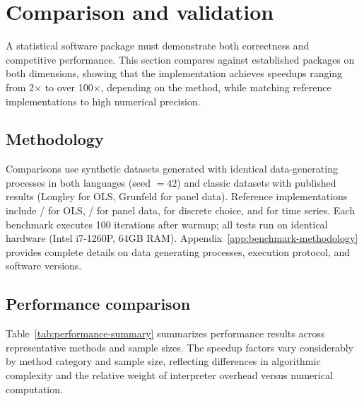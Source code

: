 
\section{Comparison and validation} \label{sec:comparison}

A statistical software package must demonstrate both correctness and competitive
performance. This section compares  against established
 packages on both dimensions, showing that the 
implementation achieves speedups ranging from 2$\times$ to over
100$\times$, depending on the method, while matching reference implementations
to high numerical precision.

\subsection{Methodology}

Comparisons use synthetic datasets generated with identical data-generating
processes in both languages (seed $= 42$) and classic datasets with published
results (Longley for OLS, Grunfeld for panel data). Reference implementations
include / for OLS, / for panel data,
 for discrete choice, and  for time series. Each
benchmark executes 100 iterations after warmup; all tests run on identical
hardware (Intel i7-1260P, 64GB RAM). Appendix~\ref{app:benchmark-methodology}
provides complete details on data generating processes, execution protocol,
and software versions.

\subsection{Performance comparison}

Table~\ref{tab:performance-summary} summarizes performance results across
representative methods and sample sizes. The speedup factors vary considerably
by method category and sample size, reflecting differences in algorithmic
complexity and the relative weight of interpreter overhead versus numerical
computation.

